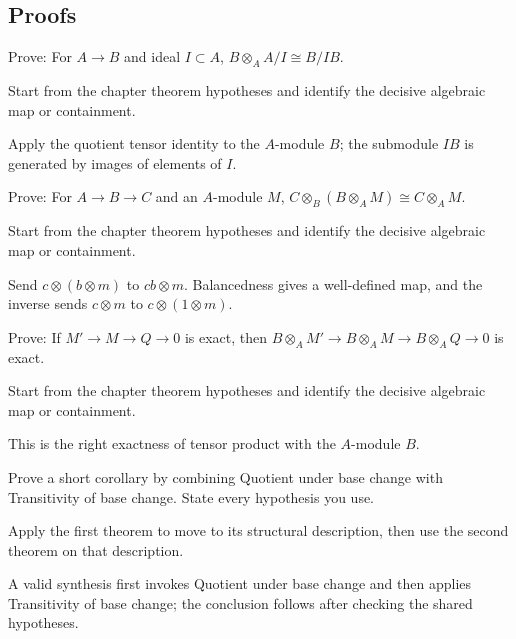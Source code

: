 \subsection*{Proofs}

\begin{exercise}\label{exr:v11-expand-06}
Prove: For $A\to B$ and ideal $I\subset A$, $B\otimes_A A/I\cong B/IB$.
\end{exercise}
\begin{hint}
Start from the chapter theorem hypotheses and identify the decisive algebraic map or containment.
\end{hint}
\begin{solution}
Apply the quotient tensor identity to the $A$-module $B$; the submodule $IB$ is generated by images of elements of $I$.
\end{solution}

\begin{exercise}\label{exr:v11-expand-07}
Prove: For $A\to B\to C$ and an $A$-module $M$, $C\otimes_B(B\otimes_A M)\cong C\otimes_A M$.
\end{exercise}
\begin{hint}
Start from the chapter theorem hypotheses and identify the decisive algebraic map or containment.
\end{hint}
\begin{solution}
Send $c\otimes(b\otimes m)$ to $cb\otimes m$. Balancedness gives a well-defined map, and the inverse sends $c\otimes m$ to $c\otimes(1\otimes m)$.
\end{solution}

\begin{exercise}\label{exr:v11-expand-08}
Prove: If $M'\to M\to Q\to0$ is exact, then $B\otimes_A M'\to B\otimes_A M\to B\otimes_A Q\to0$ is exact.
\end{exercise}
\begin{hint}
Start from the chapter theorem hypotheses and identify the decisive algebraic map or containment.
\end{hint}
\begin{solution}
This is the right exactness of tensor product with the $A$-module $B$.
\end{solution}

\begin{exercise}\label{exr:v11-expand-09}
Prove a short corollary by combining Quotient under base change with Transitivity of base change. State every hypothesis you use.
\end{exercise}
\begin{hint}
Apply the first theorem to move to its structural description, then use the second theorem on that description.
\end{hint}
\begin{solution}
A valid synthesis first invokes Quotient under base change and then applies Transitivity of base change; the conclusion follows after checking the shared hypotheses.
\end{solution}

